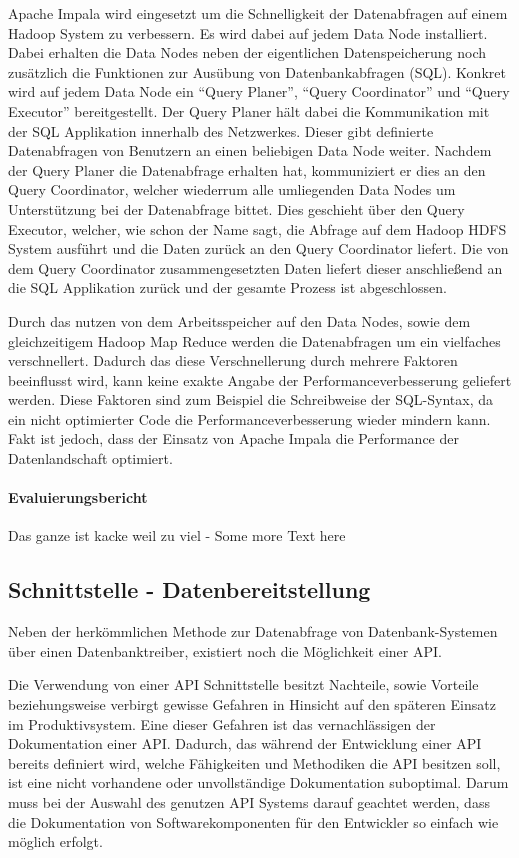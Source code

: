 Apache Impala wird eingesetzt um die Schnelligkeit der Datenabfragen auf
einem Hadoop System zu verbessern. Es wird dabei auf jedem Data Node
installiert. Dabei erhalten die Data Nodes neben der eigentlichen
Datenspeicherung noch zusätzlich die Funktionen zur Ausübung von
Datenbankabfragen (SQL). Konkret wird auf jedem Data Node ein ``Query Planer'',
``Query Coordinator'' und ``Query Executor'' bereitgestellt. Der Query Planer
hält dabei die Kommunikation mit der SQL Applikation innerhalb des Netzwerkes.
Dieser gibt definierte Datenabfragen von Benutzern an einen beliebigen Data
Node weiter. Nachdem der Query Planer die Datenabfrage erhalten hat,
kommuniziert er dies an den Query Coordinator, welcher wiederrum alle
umliegenden Data Nodes um Unterstützung bei der Datenabfrage bittet.
Dies geschieht über den Query Executor, welcher, wie schon der Name sagt,
die Abfrage auf dem Hadoop HDFS System ausführt und die Daten zurück an den
Query Coordinator liefert. Die von dem Query Coordinator zusammengesetzten
Daten liefert dieser anschließend an die SQL Applikation zurück und der
gesamte Prozess ist abgeschlossen.

Durch das nutzen von dem Arbeitsspeicher auf den Data Nodes, sowie dem
gleichzeitigem Hadoop Map Reduce werden die Datenabfragen um ein vielfaches
verschnellert. Dadurch das diese Verschnellerung durch mehrere Faktoren
beeinflusst wird, kann keine exakte Angabe der Performanceverbesserung
geliefert werden. Diese Faktoren sind zum Beispiel die Schreibweise der
SQL-Syntax, da ein nicht optimierter Code die Performanceverbesserung
wieder mindern kann. Fakt ist jedoch, dass der Einsatz von Apache Impala
die Performance der Datenlandschaft optimiert.
\nl%

\paragraph{Evaluierungsbericht}
\label{paragraph:hadoop_hive_impala_evaluierung}
Das ganze ist kacke weil zu viel - Some more Text here
\nl%


\subsection{Schnittstelle - Datenbereitstellung}
\label{subsec:schnittstelle_datenbereitstellung}
Neben der herkömmlichen Methode zur Datenabfrage von Datenbank-Systemen über
einen Datenbanktreiber, existiert noch die Möglichkeit einer API.

Die Verwendung von einer API Schnittstelle besitzt Nachteile, sowie Vorteile
beziehungsweise verbirgt gewisse Gefahren in Hinsicht auf den späteren Einsatz
im Produktivsystem. Eine dieser Gefahren ist das vernachlässigen der
Dokumentation einer API. Dadurch, das während der Entwicklung einer API bereits
definiert wird, welche Fähigkeiten und Methodiken die API besitzen soll, ist
eine nicht vorhandene oder unvollständige Dokumentation suboptimal. Darum muss
bei der Auswahl des genutzen API Systems darauf geachtet werden, dass die
Dokumentation von Softwarekomponenten für den Entwickler so einfach wie möglich
erfolgt.

